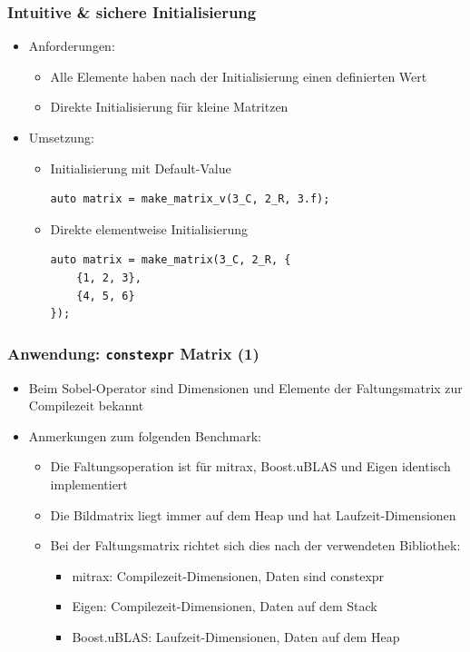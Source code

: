 \documentclass{beamer}
\begin{document}
\begin{frame}[fragile]
    \frametitle{Intuitive \& sichere Initialisierung}
    \begin{itemize}
        \item Anforderungen:
        \begin{itemize}
            \item Alle Elemente haben nach der Initialisierung einen definierten Wert
            \item Direkte Initialisierung für kleine Matritzen
        \end{itemize}
    \item Umsetzung:
    \begin{itemize}
        \item Initialisierung mit Default-Value
\begin{verbatim}
auto matrix = make_matrix_v(3_C, 2_R, 3.f);
\end{verbatim}
        \item Direkte elementweise Initialisierung
\begin{verbatim}
auto matrix = make_matrix(3_C, 2_R, {
    {1, 2, 3},
    {4, 5, 6}
});
\end{verbatim}
\end{itemize}
\end{itemize}
\end{frame}
\begin{frame}
    \frametitle{Anwendung: \texttt{constexpr} Matrix (1)}
    \begin{itemize}
        \item Beim Sobel-Operator sind Dimensionen und Elemente der Faltungsmatrix zur Compilezeit bekannt
        \item Anmerkungen zum folgenden Benchmark:
        \begin{itemize}
            \item Die Faltungsoperation ist für mitrax, Boost.uBLAS und Eigen identisch implementiert
            \item Die Bildmatrix liegt immer auf dem Heap und hat Laufzeit-Dimensionen
            \item Bei der Faltungsmatrix richtet sich dies nach der verwendeten Bibliothek:
            \begin{itemize}
                \item mitrax: Compilezeit-Dimensionen, Daten sind constexpr
                \item Eigen: Compilezeit-Dimensionen, Daten auf dem Stack
                \item Boost.uBLAS: Laufzeit-Dimensionen, Daten auf dem Heap
            \end{itemize}
        \end{itemize}
    \end{itemize}
\end{frame}
\end{document}
